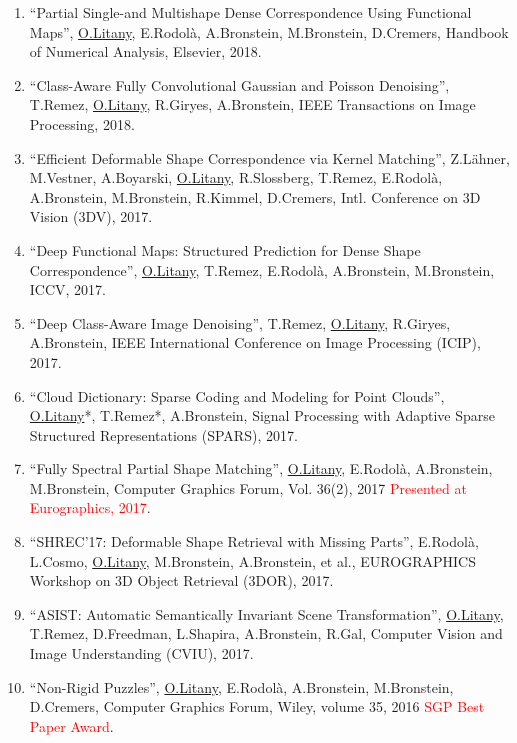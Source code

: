 \begin{enumerate}
\item ``Partial Single-and Multishape Dense Correspondence Using Functional Maps'', \underline{O.Litany}, E.Rodol{\`a}, A.Bronstein, M.Bronstein, D.Cremers, Handbook of Numerical Analysis, Elsevier, 2018.

\item ``Class-Aware Fully Convolutional {Gaussian} and {Poisson} Denoising'', T.Remez, \underline{O.Litany}, R.Giryes, A.Bronstein, IEEE Transactions on Image Processing, 2018.

\item ``Efficient Deformable Shape Correspondence via Kernel Matching'', Z.L{\"a}hner, M.Vestner, A.Boyarski, \underline{O.Litany}, R.Slossberg, T.Remez, E.Rodol{\`a}, A.Bronstein, M.Bronstein, R.Kimmel, D.Cremers, Intl. Conference on 3D Vision (3DV), 2017.

\item ``Deep Functional Maps: Structured Prediction for Dense Shape Correspondence'', \underline{O.Litany}, T.Remez, E.Rodol{\`a}, A.Bronstein, M.Bronstein, ICCV, 2017.

\item ``Deep Class-Aware Image Denoising'', T.Remez, \underline{O.Litany}, R.Giryes, A.Bronstein, IEEE International Conference on Image Processing (ICIP), 2017.

\item ``Cloud Dictionary: Sparse Coding and Modeling for Point Clouds'', \underline{O.Litany}*, T.Remez*, A.Bronstein, Signal Processing with Adaptive Sparse Structured Representations (SPARS), 2017.

\item ``Fully Spectral Partial Shape Matching'', \underline{O.Litany}, E.Rodol{\`a}, A.Bronstein, M.Bronstein, Computer Graphics Forum, Vol. 36(2), 2017 \textcolor{red}{Presented at Eurographics, 2017}.

\item ``{SHREC}’17: Deformable Shape Retrieval with Missing Parts'', E.Rodol{\`a}, L.Cosmo, \underline{O.Litany}, M.Bronstein, A.Bronstein, et al., EUROGRAPHICS Workshop on 3D Object Retrieval (3DOR), 2017.

\item ``{ASIST}: Automatic Semantically Invariant Scene Transformation'', \underline{O.Litany}, T.Remez, D.Freedman, L.Shapira, A.Bronstein, R.Gal, Computer Vision and Image Understanding (CVIU), 2017.

\item ``Non-Rigid Puzzles'', \underline{O.Litany}, E.Rodol{\`a}, A.Bronstein, M.Bronstein, D.Cremers, Computer Graphics Forum, Wiley, volume 35, 2016 \textcolor{red}{SGP Best Paper Award}.


\end{enumerate}
